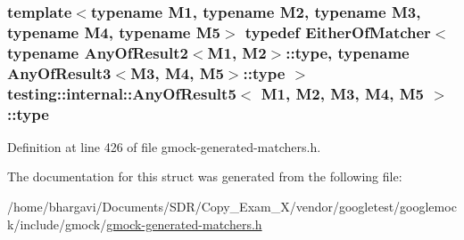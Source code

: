 \subsubsection[{\texorpdfstring{type}{type}}]{\setlength{\rightskip}{0pt plus 5cm}template$<$typename M1, typename M2, typename M3, typename M4, typename M5$>$ typedef {\bf Either\+Of\+Matcher}$<$ typename {\bf Any\+Of\+Result2}$<$M1, M2$>$\+::{\bf type}, typename {\bf Any\+Of\+Result3}$<$M3, M4, M5$>$\+::{\bf type} $>$ {\bf testing\+::internal\+::\+Any\+Of\+Result5}$<$ M1, M2, M3, M4, M5 $>$\+::{\bf type}}\hypertarget{structtesting_1_1internal_1_1_any_of_result5_a459a06dc5791313dce942668714f0c99}{}\label{structtesting_1_1internal_1_1_any_of_result5_a459a06dc5791313dce942668714f0c99}


Definition at line 426 of file gmock-\/generated-\/matchers.\+h.



The documentation for this struct was generated from the following file\+:\begin{DoxyCompactItemize}
\item 
/home/bhargavi/\+Documents/\+S\+D\+R/\+Copy\+\_\+\+Exam\+\_\+X/vendor/googletest/googlemock/include/gmock/\hyperlink{gmock-generated-matchers_8h}{gmock-\/generated-\/matchers.\+h}\end{DoxyCompactItemize}

